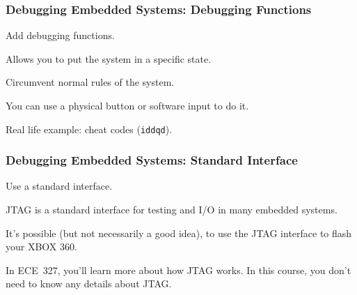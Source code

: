 \begin{frame}
\frametitle{Debugging Embedded Systems: Debugging Functions}
\begin{changemargin}{1cm}

Add debugging functions.

Allows you to put the system in a specific state.

Circumvent normal rules of the system.

You can use a physical button or software input to do it. 

Real life example: cheat codes (\texttt{iddqd}). 

\end{changemargin}
\end{frame}

\begin{frame}
\frametitle{Debugging Embedded Systems: Standard Interface}
\begin{changemargin}{1cm}

Use a standard interface.

JTAG is a standard interface for testing and I/O in many embedded systems. 

It's possible (but not necessarily a good idea), to use the JTAG interface to flash your XBOX 360.

In ECE~327, you'll learn more about how JTAG works. In this course, you don't need to know any details about JTAG.

\end{changemargin}
\end{frame}






